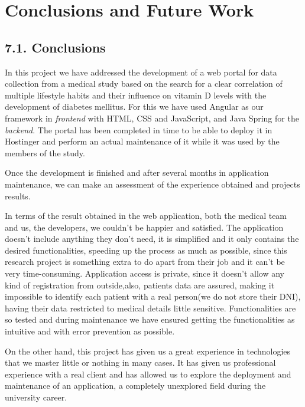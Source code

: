 \chapter*{Conclusions and Future Work}

\section*{7.1. Conclusions}
    In this project we have addressed the development of a web portal for data collection from a medical study based on the search for a clear correlation of multiple lifestyle habits and their influence on vitamin D levels with the development of diabetes mellitus. For this we have used Angular as our framework in \textit{frontend} with HTML, CSS and JavaScript, and Java Spring for the \textit{backend}. The portal has been completed in time to be able to deploy it in Hostinger and perform an actual maintenance of it while it was used by the members of the study.\newline

    Once the development is finished and after several months in application maintenance, we can make an assessment of the experience obtained  and projects results. \newline

    In terms of the result obtained in the web application, both the medical team and us, the developers, we couldn't be happier and satisfied. The application doesn't include anything they don't need, it is simplified and it only contains the desired functionalities, speeding up the process as much as possible, since this research project is something extra to do apart from their job and it can't be very time-consuming. Application access is private, since it doesn't allow any kind of registration from outside,also, patients data are assured, making it impossible to identify each patient with a real person(we do not store their DNI), having their data restricted  to medical details little sensitive. Functionalities are so tested and during maintenance we have ensured getting the functionalities as intuitive and with error prevention as possible. \newline
    
    On the other hand, this project has given us a great experience in technologies that we master little or nothing in many cases. It has given us professional experience with a real client and has allowed us to explore the deployment and maintenance of an application, a completely unexplored field during the university career. \newline
   
